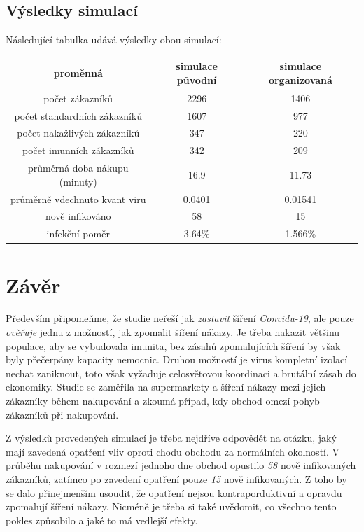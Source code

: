 \documentclass[11pt,a4paper]{article}
\begin{document}
\subsection{Výsledky simulací}
Následující tabulka udává výsledky obou simulací:

\begin{tabular}{ |c|c|c| } 
    \hline
        proměnná & simulace původní & simulace organizovaná \\  \hline
        počet zákazníků & 2296 & 1406  \\ 
        počet standardních zákazníků & 1607 & 977  \\ 
        počet nakažlivých zákazníků & 347 & 220 \\ 
        počet imunních zákazníků & 342 & 209 \\ 
        průměrná doba nákupu (minuty) & 16.9 & 11.73 \\
        průměrně vdechnuto kvant viru & 0.0401 & 0.01541 \\
        nově infikováno & 58 & 15 \\
        infekční poměr & 3.64\% & 1.566\% \\
    \hline
\end{tabular}

\section{Závěr}
Především připomeňme, že studie neřeší jak \emph{zastavit} šíření \emph{Convidu-19}, ale pouze \emph{ověřuje} jednu z možností, jak zpomalit šíření nákazy. Je třeba nakazit většinu populace, aby se vybudovala imunita, bez zásahů zpomalujících šíření by však byly přečerpány kapacity nemocnic. Druhou možností je virus kompletní izolací nechat zaniknout, toto však vyžaduje celosvětovou koordinaci a brutální zásah do ekonomiky. Studie se zaměřila na supermarkety a šíření nákazy mezi jejich zákazníky během nakupování a zkoumá případ, kdy obchod omezí pohyb zákazníků při nakupování. 

Z výsledků provedených simulací je třeba nejdříve odpovědět na otázku, jaký mají zavedená opatření vliv oproti chodu obchodu za normálních okolností.
V průběhu nakupování v rozmezí jednoho dne obchod opustilo \emph{58} nově infikovaných zákazníků, zatímco po zavedení opatření pouze \emph{15} nově infikovaných. Z toho by se dalo přinejmenším usoudit, že opatření nejsou kontraporduktivní a opravdu zpomalují šíření nákazy. Nicméně je třeba si také uvědomit, co všechno tento pokles způsobilo a jaké to má vedlejší efekty.
\end{document}
